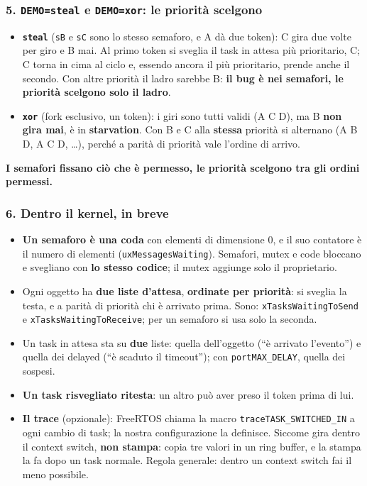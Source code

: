 \subsubsection*{5. \texttt{DEMO=steal} e \texttt{DEMO=xor}: le priorità scelgono}
\begin{itemize}
    \item \textbf{\texttt{steal}} (\texttt{sB} e \texttt{sC} sono lo stesso semaforo, e A dà due token): C gira due volte per giro e B mai. Al primo token si sveglia il task in attesa più prioritario, C; C torna in cima al ciclo e, essendo ancora il più prioritario, prende anche il secondo. Con altre priorità il ladro sarebbe B: \textbf{il bug è nei semafori, le priorità scelgono solo il ladro}.
    \item \textbf{\texttt{xor}} (fork esclusivo, un token): i giri sono tutti validi (A C D), ma B \textbf{non gira mai}, è in \textbf{starvation}. Con B e C alla \textbf{stessa} priorità si alternano (A B D, A C D, \dots), perché a parità di priorità vale l'ordine di arrivo.
\end{itemize}
\textbf{I semafori fissano ciò che è permesso, le priorità scelgono tra gli ordini permessi.}

\subsubsection*{6. Dentro il kernel, in breve}
\begin{itemize}
    \item \textbf{Un semaforo è una coda} con elementi di dimensione 0, e il suo contatore è il numero di elementi (\texttt{uxMessagesWaiting}). Semafori, mutex e code bloccano e svegliano con \textbf{lo stesso codice}; il mutex aggiunge solo il proprietario.
    \item Ogni oggetto ha \textbf{due liste d'attesa}, \textbf{ordinate per priorità}: si sveglia la testa, e a parità di priorità chi è arrivato prima. Sono:
    \newline\texttt{xTasksWaitingToSend} e \texttt{xTasksWaitingToReceive}; per un semaforo si usa solo la seconda.
    \item Un task in attesa sta su \textbf{due} liste: quella dell'oggetto (``è arrivato l'evento'') e quella dei delayed (``è scaduto il timeout''); con \texttt{portMAX\_DELAY}, quella dei sospesi.
    \item \textbf{Un task risvegliato ritesta}: un altro può aver preso il token prima di lui.
    \item \textbf{Il trace} (opzionale): FreeRTOS chiama la macro \texttt{traceTASK\_SWITCHED\_IN} a ogni cambio di task; la nostra configurazione la definisce. Siccome gira dentro il context switch, \textbf{non stampa}: copia tre valori in un ring buffer, e la stampa la fa dopo un task normale. Regola generale: dentro un context switch fai il meno possibile.
\end{itemize}

